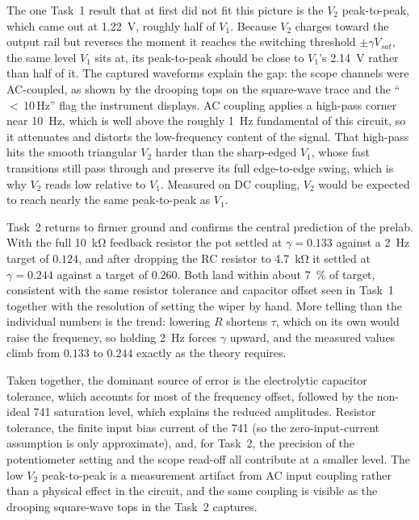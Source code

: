 \documentclass[11pt]{article}
\begin{document}
The one Task~1 result that at first did not fit this picture is the $V_2$
peak-to-peak, which came out at \SI{1.22}{\volt}, roughly half of $V_1$. Because
$V_2$ charges toward the output rail but reverses the moment it reaches the
switching threshold $\pm\gamma V_{sat}$, the same level $V_1$ sits at, its
peak-to-peak should be close to $V_1$'s \SI{2.14}{\volt} rather than half of it.
The captured waveforms explain the gap: the scope channels were AC-coupled, as
shown by the drooping tops on the square-wave trace and the ``$<$\,10\,Hz'' flag
the instrument displays. AC coupling applies a high-pass corner near
\SI{10}{\hertz}, which is well above the roughly \SI{1}{\hertz} fundamental of this
circuit, so it attenuates and distorts the low-frequency content of the signal.
That high-pass hits the smooth triangular $V_2$ harder than the sharp-edged $V_1$,
whose fast transitions still pass through and preserve its full edge-to-edge swing,
which is why $V_2$ reads low relative to $V_1$. Measured on DC coupling, $V_2$
would be expected to reach nearly the same peak-to-peak as $V_1$.

Task~2 returns to firmer ground and confirms the central prediction of the prelab.
With the full \SI{10}{\kilo\ohm} feedback resistor the pot settled at
$\gamma=0.133$ against a \SI{2}{\hertz} target of $0.124$, and after dropping the
RC resistor to \SI{4.7}{\kilo\ohm} it settled at $\gamma=0.244$ against a target of
$0.260$. Both land within about \SI{7}{\percent} of target, consistent with the
same resistor tolerance and capacitor offset seen in Task~1 together with the
resolution of setting the wiper by hand. More telling than the individual numbers
is the trend: lowering $R$ shortens $\tau$, which on its own would raise the
frequency, so holding \SI{2}{\hertz} forces $\gamma$ upward, and the measured
values climb from $0.133$ to $0.244$ exactly as the theory requires.

Taken together, the dominant source of error is the electrolytic capacitor
tolerance, which accounts for most of the frequency offset, followed by the
non-ideal \SI{741}{} saturation level, which explains the reduced amplitudes.
Resistor tolerance, the finite input bias current of the \SI{741}{} (so the
zero-input-current assumption is only approximate), and, for Task~2, the precision
of the potentiometer setting and the scope read-off all contribute at a smaller
level. The low $V_2$ peak-to-peak is a measurement artifact from AC input coupling
rather than a physical effect in the circuit, and the same coupling is visible as
the drooping square-wave tops in the Task~2 captures.

\end{document}
